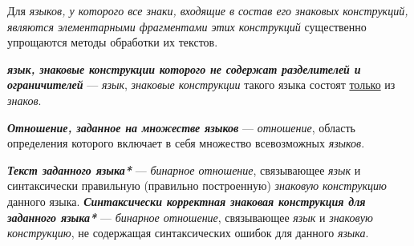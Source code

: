 Для \textit{языков, у которого все знаки, входящие в состав его знаковых конструкций, являются элементарными фрагментами этих конструкций} существенно упрощаются методы обработки их текстов.

\textit{\textbf{язык, знаковые конструкции которого не содержат разделителей и ограничителей}} --- \textit{язык}, \textit{знаковые конструкции} такого языка состоят \underline{только} из \textit{знаков}.

\textit{\textbf{Отношение, заданное на множестве языков\scnsupergroupsign}} --- \textit{отношение}, область определения которого включает в себя множество всевозможных \textit{языков}.

\textit{\textbf{Текст заданного языка*}} --- \textit{бинарное отношение}, связывающее \textit{язык} и синтаксически правильную (правильно построенную) \textit{знаковую конструкцию} данного языка.
\textit{\textbf{Синтаксически корректная знаковая конструкция для заданного языка*}} --- \textit{бинарное отношение}, связывающее \textit{язык} и \textit{знаковую конструкцию}, не содержащая синтаксических ошибок для данного \textit{языка}.

